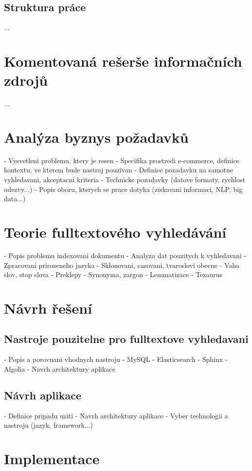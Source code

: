 \documentclass[FM,DP]{tulthesis}
\begin{document}
\section{Struktura práce}
...


\chapter{Komentovaná rešerše informačních zdrojů}
...


\chapter{Analýza byznys požadavků}
- Vysvetleni problemu, ktery je resen
- Specifika prostredi e-commerce, definice kontextu, ve kterem bude nastroj pouzivan
- Definice pozadavku na samotne vyhledavani, akceptacni kriteria
- Technicke pozadavky (datove formaty, rychlost odezvy...)
- Popis oboru, kterych se prace dotyka (ziskavani informaci, NLP, big data...)

\chapter{Teorie fulltextového vyhledávání}
- Popis problemu indexovani dokumentu
- Analyza dat pouzitych k vyhledavani
- Zpracovani prirozeneho jazyka
  - Sklonovani, casovani, tvaroslovi obecne
  - Vaha slov, stop slova
  - Preklepy
  - Synonyma, zargon
  - Lemmatizace
  - Tezaurus

\chapter{Návrh řešení}

\section{Nastroje pouzitelne pro fulltextove vyhledavani}
- Popis a porovnani vhodnych nastroju
  - MySQL
  - Elasticsearch
  - Sphinx
  - Algolia
  - Navrh architektury aplikace

\section{Návrh aplikace}
- Definice pripadu uziti
- Navrh architektury aplikace
- Vyber technologii a nastroju (jazyk, framework...)

\chapter{Implementace}
\end{document}
